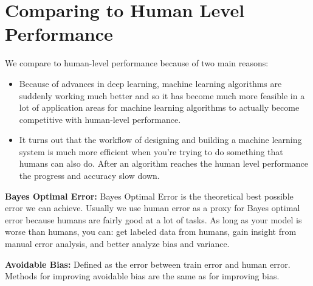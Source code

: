 \section{Comparing to Human Level Performance}

We compare to human-level performance because of two main reasons:

\begin{itemize}[wide, labelwidth=!, labelindent=0pt]
\itemsep0em 
    \item Because of advances in deep learning, machine learning algorithms are suddenly working much better and so it has become much more feasible in a lot of application areas for machine learning algorithms to actually become competitive with human-level performance.
    \item It turns out that the workflow of designing and building a machine learning system is much more efficient when you're trying to do something that humans can also do. After an algorithm reaches the human level performance the progress and accuracy slow down. \vspace*{-\baselineskip}
\end{itemize}

\textbf{Bayes Optimal Error: } Bayes Optimal Error is the theoretical best possible error we can achieve. Usually we use human error as a proxy for Bayes optimal error because humans are fairly good at a lot of tasks. As long as your model is worse than humans, you can: get labeled data from humans, gain insight from manual error analysis, and better analyze bias and variance.

\textbf{Avoidable Bias: } Defined as the error between train error and human error. Methods for improving avoidable bias are the same as for improving bias.

